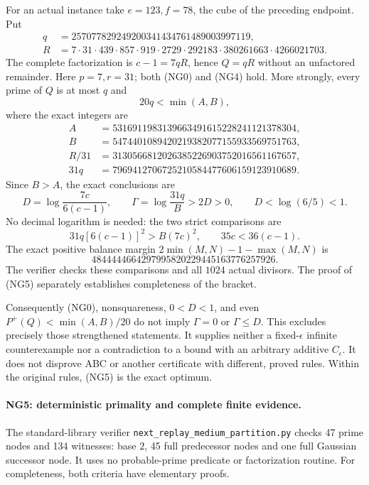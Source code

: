 For an actual instance take $e=123,f=78$, the cube of the preceding
endpoint. Put
\[
 \begin{split}
 q&=257077829249200341434761489003997119,\\
 R&=7\cdot31\cdot439\cdot857\cdot919\cdot2729
      \cdot292183\cdot380261663\cdot4266021703.
 \end{split}
\]
The complete factorization is $c-1=7qR$, hence $Q=qR$ without an
unfactored remainder. Here $p=7,r=31$; both (NG0) and (NG4) hold.
More strongly, every prime of $Q$ is at most $q$ and
\[
 20q<\min(A,B),                                      \tag{NG6}
\]
where the exact integers are
\[
 \begin{aligned}
 A&=5316911983139663491615228241121378304,\\
 B&=5474401089420219382077155933569751763,\\
 R/31&=3130566812026385226903752016561167657,\\
 31q&=7969412706725210584477606159123910689.
 \end{aligned}
\]
Since $B>A$, the exact conclusions are
\[
 D=\log\frac{7c}{6(c-1)},\qquad
 \Gamma=\log\frac{31q}{B}>2D>0,\qquad
 D<\log(6/5)<1.                                      \tag{NG7}
\]
No decimal logarithm is needed: the two strict comparisons are
\[
 31q[6(c-1)]^2>B(7c)^2,\qquad
 35c<36(c-1).
\]
The exact positive balance margin
$2\min(M,N)-1-\max(M,N)$ is
\[
 4844444664297995820229445163776257926.
\]
The verifier checks these comparisons and all $1024$ actual divisors.
The proof of (NG5) separately establishes completeness of the bracket.

Consequently (NG0), nonsquareness, $0<D<1$, and even
$P^+(Q)<\min(A,B)/20$ do not imply $\Gamma=0$ or $\Gamma\leq D$.
This excludes precisely those strengthened statements. It supplies
neither a fixed-$\epsilon$ infinite counterexample nor a contradiction
to a bound with an arbitrary additive $C_\epsilon$. It does not
disprove ABC or another certificate with different, proved rules.
Within the original rules, (NG5) is the exact optimum.

\paragraph{NG5: deterministic primality and complete finite evidence.}
The standard-library verifier
\texttt{next\_replay\_medium\_\allowbreak{}partition.py} checks
47 prime nodes and 134 witnesses: base $2$, 45 full predecessor
nodes and one full Gaussian successor node. It uses no probable-prime
predicate or factorization routine. For completeness, both criteria
have elementary proofs.

